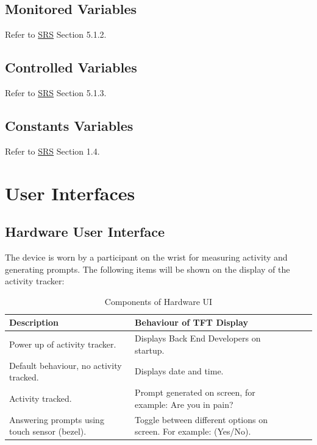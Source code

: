 \documentclass[12pt, titlepage]{article}
\begin{document}
\subsection{Monitored Variables}

Refer to \href{https://github.com/zakerl/Capstone_Project/blob/main/docs/SRS/SRS.pdf}{SRS} Section 5.1.2.
\subsection{Controlled Variables}

Refer to \href{https://github.com/zakerl/Capstone_Project/blob/main/docs/SRS/SRS.pdf}{SRS} Section 5.1.3.

\subsection{Constants Variables}

Refer to \href{https://github.com/zakerl/Capstone_Project/blob/main/docs/SRS/SRS.pdf}{SRS} Section 1.4.
\section{User Interfaces}


\subsection{Hardware User Interface}

The device is worn by a participant on the wrist for measuring activity and generating  prompts. The following items will be shown on the display of the activity tracker:
\begin{table}[H]
	\begin{tabularx}{1.05\textwidth} { 
		  | >{\centering\arraybackslash}X 
		  | >{\centering\arraybackslash}X 
		  | >{\centering\arraybackslash}X 
		  | >{\centering\arraybackslash}X | }
		 \hline
		 \textbf{Description} & \textbf{Behaviour of TFT Display} \\
		 \hline
		Power up of activity tracker. & Displays Back End Developers on startup.\\
		\hline
		 Default behaviour, no activity tracked.  & Displays date and time.\\
		 \hline
		   Activity tracked. & Prompt generated on screen, for example: Are you in pain?\\
		\hline 
		Answering prompts using touch sensor (bezel). & Toggle between different 				options on screen. For example: (Yes/No).\\
		\hline
	\end{tabularx}
\caption{\label{Hardware User Interface}Components of Hardware UI}  
\end{table}
\end{document}
